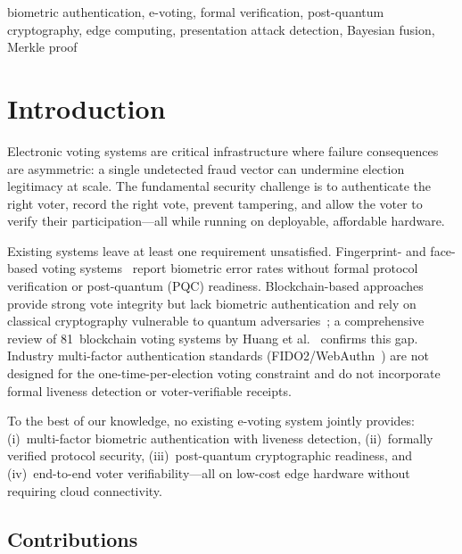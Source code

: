 \documentclass[conference]{IEEEtran}
\begin{document}
\begin{IEEEkeywords}
biometric authentication, e-voting, formal verification,
post-quantum cryptography, edge computing, presentation attack detection,
Bayesian fusion, Merkle proof
\end{IEEEkeywords}

\section{Introduction}
\label{sec:intro}

Electronic voting systems are critical infrastructure where failure
consequences are asymmetric: a single undetected fraud vector can undermine
election legitimacy at scale. The fundamental security challenge is to
authenticate the right voter, record the right vote, prevent tampering,
and allow the voter to verify their participation—all while running on
deployable, affordable hardware.

Existing systems leave at least one requirement unsatisfied.
Fingerprint- and face-based voting systems~\cite{bello2021biometric,
sanchez2020biometric,komatineni2020biometric,nagaraj2022voting} report
biometric error rates without formal protocol
verification or post-quantum (PQC) readiness. Blockchain-based
approaches~\cite{ayed2017conceptual,hardwick2018voting,faruk2024transforming}
provide strong vote
integrity but lack biometric authentication and rely on classical cryptography
vulnerable to quantum adversaries~\cite{bernstein2017post}; a
comprehensive review of 81~blockchain voting systems by Huang et
al.~\cite{huang2022blockchain_voting} confirms this gap. Industry
multi-factor authentication standards (FIDO2/WebAuthn~\cite{fido2_webauthn})
are not designed for the one-time-per-election voting constraint and do not
incorporate formal liveness detection or voter-verifiable receipts.

To the best of our knowledge, no existing e-voting system jointly provides:
(i)~multi-factor
biometric authentication with liveness detection, (ii)~formally verified
protocol security, (iii)~post-quantum cryptographic readiness, and
(iv)~end-to-end voter verifiability—all on low-cost edge hardware without
requiring cloud connectivity.

\subsection*{Contributions}
\end{document}
